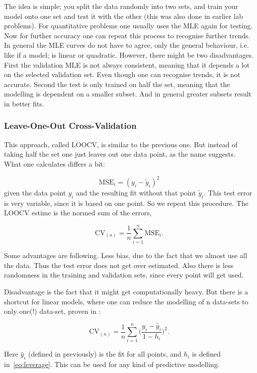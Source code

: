\documentclass{article}
\begin{document}
The idea is simple; you split the data randomly into two sets, and train your model onto one set and test it with the other (this was also done in earlier lab problems). For quantitative problems one usually uses the MLE again for testing. Now for further accuracy one can repeat this process to recognise further trends. In general the MLE curves do not have to agree, only the general behaviour, i.e. like if a model; is linear or quadratic. However, there might be two disadvantages. First the validation MLE is not always consistent, meaning that it depends a lot on the selected validation set. Even though one can recognise trends, it is not accurate. Second the test is only trained on half the set, meaning that the modelling is dependent on a smaller subset. And in general greater subsets result in better fits.

\subsubsection{Leave-One-Out Cross-Validation}

This approach, called LOOCV, is similar to the previous one. But instead of taking half the set one just leaves out one data point, as the name suggests. What one calculates differs a bit:

\[
\text{MSE}_i = (y_i-\widetilde{y}_i)^2
\]
given the data point $y_i$ and the resulting fit without that point $\widetilde{y}_i$. This test error is very variable, since it is based on one point. So we repeat this procedure. The LOOCV estime is the normed sum of the errors, 

\[
\text{CV}_{(n)} = \frac{1}{n} \sum_{i=1}^n \text{MSE}_i.
\]

Some advantages are following. Less bias, due to the fact that we almost use all the data. Thus the test error does not get over estimated. Also there is less randomness in the training and validation sets, since every point will get used. \par
Disadvantage is the fact that it might get computationally heavy. But there is a
shortcut for linear models, where one can reduce the modelling of n  data-sets
to only one(!) data-set, proven in \cite{rob_j_hyndman_2014}:

\begin{equation}
    \text{CV}_{(n)} = \frac{1}{n} \sum_{i=1}^n \Bigg(
    \frac{y_i-\hat{y}_i}{1-h_i}
    \Bigg)^2.
\end{equation}

Here $\hat{y}_i$ (defined in previously) is the fit for all points, and $h_i$ is defined in~\eqref{eq:leverage}. This can be used for any kind of predictive modelling. 
\end{document}
